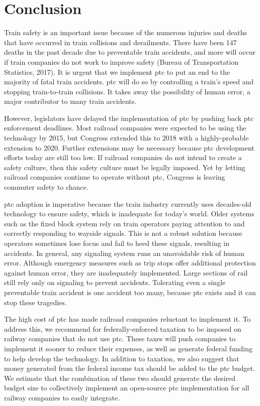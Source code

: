 \documentclass[11pt, titlepage]{article}
\begin{document}
\pagebreak

\section{Conclusion}

Train safety is an important issue because of the numerous injuries and deaths that
have occurred in train collisions and derailments. There have been 147 deaths in the
past decade due to preventable train accidents, and more will occur if train
companies do not work to improve safety (Bureau of Transportation Statistics, 2017).
It is urgent that we implement \gls{ptc} to put an end to the majority of fatal
train accidents. \gls{ptc} will do so by controlling a train’s speed and stopping
train-to-train collisions. It takes away the possibility of human error, a major
contributor to many train accidents.

However, legislators have delayed the implementation of \gls{ptc} by pushing back
\gls{ptc} enforcement deadlines. Most railroad companies were expected to be using
the technology by 2015, but Congress extended this to 2018 with a highly-probable
extension to 2020. Further extensions may be necessary because \gls{ptc} development
efforts today are still too low. If railroad companies do not intend to create a
safety culture, then this safety culture must be legally imposed. Yet by letting
railroad companies continue to operate without \gls{ptc}, Congress is leaving
commuter safety to chance.

\gls{ptc} adoption is imperative because the train industry currently uses
decades-old technology to ensure safety, which is inadequate for today’s world.
Older systems such as the fixed block system rely on train operators paying
attention to and correctly responding to wayside signals. This is not a robust
solution because operators sometimes lose focus and fail to heed these signals,
resulting in accidents. In general, any signaling system runs an unavoidable risk of
human error. Although emergency measures such as trip stops offer additional
protection against human error, they are inadequately implemented. Large sections of
rail still rely only on signaling to prevent accidents. Tolerating even a single
preventable train accident is one accident too many, because \gls{ptc} exists and it
can stop these tragedies.

The high cost of \gls{ptc} has made railroad companies reluctant to
implement it. To address this, we recommend for federally-enforced taxation to be
imposed on railway companies that do not use \gls{ptc}. These taxes will push
companies to implement it sooner to reduce their expenses, as well as generate
federal funding to help develop the technology. In addition to taxation, we also
suggest that money generated from the federal income tax should be added to the
\gls{ptc} budget. We estimate that the combination of these two should generate the
desired budget size to collectively implement an open-source \gls{ptc}
implementation for all railway companies to easily integrate.
\end{document}
